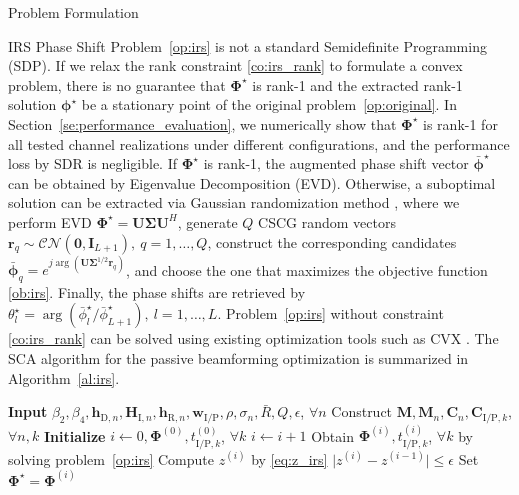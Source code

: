 \documentclass[journal]{IEEEtran}
\begin{document}
\begin{section}{Problem Formulation}
\begin{subsection}{IRS Phase Shift}
			Problem~\eqref{op:irs} is not a standard Semidefinite Programming (SDP). If we relax the rank constraint \eqref{co:irs_rank} to formulate a convex problem, there is no guarantee that $\boldsymbol{\Phi}^{\star}$ is rank-\num{1} and the extracted rank-\num{1} solution $\boldsymbol{\phi}^{\star}$ be a stationary point of the original problem~\eqref{op:original}. In Section~\ref{se:performance_evaluation}, we numerically show that $\boldsymbol{\Phi}^{\star}$ is rank-\num{1} for all tested channel realizations under different configurations, and the performance loss by SDR is negligible. If $\boldsymbol{\Phi}^{\star}$ is rank-\num{1}, the augmented phase shift vector $\bar{\boldsymbol{\phi}}^\star$ can be obtained by Eigenvalue Decomposition (EVD). Otherwise, a suboptimal solution can be extracted via Gaussian randomization method \cite{Huang2010}, where we perform EVD $\boldsymbol{\Phi}^{\star}=\boldsymbol{U}\boldsymbol{\Sigma}\boldsymbol{U}^H$, generate $Q$ CSCG random vectors $\boldsymbol{r}_q \sim \mathcal{CN}(\boldsymbol{0},\boldsymbol{I}_{L+1}),\ q=1,\dots,Q$, construct the corresponding candidates $\bar{\boldsymbol{\phi}}_q=e^{j\arg\left(\boldsymbol{U}\boldsymbol{\Sigma}^{1/2}\boldsymbol{r}_q\right)}$, and choose the one that maximizes the objective function \eqref{ob:irs}. Finally, the phase shifts are retrieved by $\theta_l^{\star}=\arg(\bar{\phi}_l^\star/\bar{\phi}_{L+1}^\star), \ l=1,\dots,L$. Problem~\eqref{op:irs} without constraint \eqref{co:irs_rank} can be solved using existing optimization tools such as CVX \cite{Grant2013}. The SCA algorithm for the passive beamforming optimization is summarized in Algorithm~\ref{al:irs}.
			\begin{algorithm}[!t]
				\caption{SCA: IRS Phase Shift.}
				\label{al:irs}
				\begin{algorithmic}[1]
					\State \textbf{Input} $\beta_2,\beta_4,\boldsymbol{h}_{\mathrm{D},n},\boldsymbol{H}_{\mathrm{I},n},\boldsymbol{h}_{\mathrm{R},n},\boldsymbol{w}_{\mathrm{I/P}},\rho,\sigma_n,\bar{R},Q,\epsilon$, $\forall n$
					\State Construct $\boldsymbol{M},\boldsymbol{M}_n,\boldsymbol{C}_{n},\boldsymbol{C}_{\mathrm{I/P},k}$, $\forall n,k$
					\State \textbf{Initialize} $i \gets 0,\boldsymbol{\Phi}^{(0)},t_{\mathrm{I/P},k}^{(0)}$, $\forall k$
					\Repeat
						\State $i \gets i + 1$
						\State Obtain $\boldsymbol{\Phi}^{(i)},t_{\mathrm{I/P},k}^{(i)}$, $\forall k$ by solving problem~\eqref{op:irs}
						\State Compute $z^{(i)}$ by \eqref{eq:z_irs}
					\Until $\lvert z^{(i)}-z^{(i-1)} \rvert \le \epsilon$
					\State Set $\boldsymbol{\Phi}^{\star}=\boldsymbol{\Phi}^{(i)}$

\end{algorithmic}
\end{algorithm}
\end{subsection}
\end{section}
\end{document}
